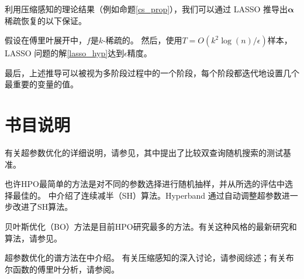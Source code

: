 利用压缩感知的理论结果（例如命题\ref{cs_prop}），我们可以通过 LASSO 推导出$\pmb{\alpha}$稀疏恢复的以下保证。
\begin{theorem}
	假设在傅里叶展开中，$f$是$k$-稀疏的。
	然后，使用$T = O(k^2 \log(n) / \epsilon)$样本，LASSO 问题的解\eqref{lasso_hyp}达到$\epsilon$精度。
\end{theorem}


最后，上述推导可以被视为多阶段过程中的一个阶段，每个阶段都迭代地设置几个最重要的变量的值。




\newpage
\section{
	书目说明
	}

有关超参数优化的详细说明，请参见\cite{recht1, recht2}，其中提出了比较双查询随机搜索的测试基准。

也许HPO最简单的方法是对不同的参数选择进行随机抽样，并从所选的评估中选择最佳的\cite{Bergstra12}。\cite{successive} 中介绍了连续减半（SH）算法。Hyperband \cite{hyperband} 通过自动调整超参数进一步改进了SH算法。

贝叶斯优化（BO）方法是目前HPO研究最多的方法。有关这种风格的最新研究和算法，请参见\cite{tpe,bayesianOPT,multitaskBO,inputBO,inequBO,highDim,rbfbayesian}。

超参数优化的谱方法在\cite{hazan2018hyperparameter}中介绍。
有关压缩感知的深入讨论，请参阅\cite{rauhut2010compressive}综述；有关布尔函数的傅里叶分析，请参阅\cite{booleananalysis}。


